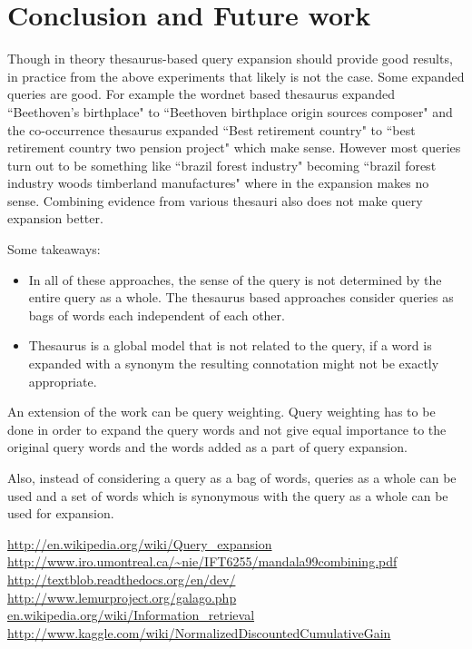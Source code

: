 \documentclass[a4paper, 12pt, notitlepage]{report}
\begin{document}
\chapter{Conclusion and Future work}

Though in theory thesaurus-based query expansion should provide good results, in practice from the above experiments that likely is not the case. Some expanded queries are good. For example the wordnet based thesaurus expanded ``Beethoven's birthplace" to ``Beethoven birthplace origin sources composer" and the co-occurrence thesaurus expanded ``Best retirement country" to ``best retirement country  two pension project" which make sense. However most queries turn out to be something like ``brazil forest industry" becoming ``brazil forest industry woods timberland  manufactures" where in the expansion makes no sense. Combining evidence from various thesauri also does not make query expansion better.

Some takeaways:
\begin{itemize}
\item In all of these approaches, the sense of the query is not determined by the entire query as a whole. The thesaurus based approaches consider queries as bags of words each independent of each other.
\item  Thesaurus is a global model that is not related to the query, if a word is expanded with a synonym the resulting connotation might not be exactly appropriate.
\end{itemize}
 
An extension of the work can be query weighting. Query weighting has to be done in order to expand the query words and not give equal importance to the original query words and the words added as a part of query expansion. 

Also, instead of considering a query as a bag of words, queries as a whole can be used and a set of words which is synonymous with the query as a whole can be used for expansion.

\begin{thebibliography}{1}
 \url{http://en.wikipedia.org/wiki/Query_expansion}
 \url{http://www.iro.umontreal.ca/~nie/IFT6255/mandala99combining.pdf}
 \url{http://textblob.readthedocs.org/en/dev/}
 \url{http://www.lemurproject.org/galago.php}
 \url{en.wikipedia.org/wiki/Information_retrieval}
 \url{http://www.kaggle.com/wiki/NormalizedDiscountedCumulativeGain}
\end{thebibliography}
\end{document}

